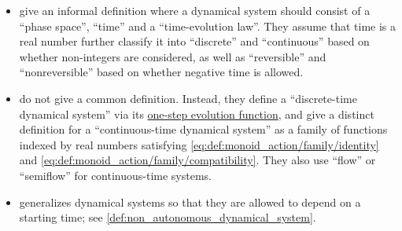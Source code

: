\begin{remark}
\begin{itemize}
    \item {} give an informal definition where a dynamical system should consist of a \enquote{phase space}, \enquote{time} and a \enquote{time-evolution law}. They assume that time is a real number further classify it into \enquote{discrete} and \enquote{continuous} based on whether non-integers are considered, as well as \enquote{reversible} and \enquote{nonreversible} based on whether negative time is allowed.

    \item {} do not give a common definition. Instead, they define a \enquote{discrete-time dynamical system} via its \hyperref[def:one_step_evolution_function]{one-step evolution function}, and give a distinct definition for a \enquote{continuous-time dynamical system} as a family of functions indexed by real numbers satisfying \ref{eq:def:monoid_action/family/identity} and \ref{eq:def:monoid_action/family/compatibility}. They also use \enquote{flow} or \enquote{semiflow} for continuous-time systems.

    \item {} generalizes dynamical systems so that they are allowed to depend on a starting time; see \cref{def:non_autonomous_dynamical_system}.
  \end{itemize}
\end{remark}

